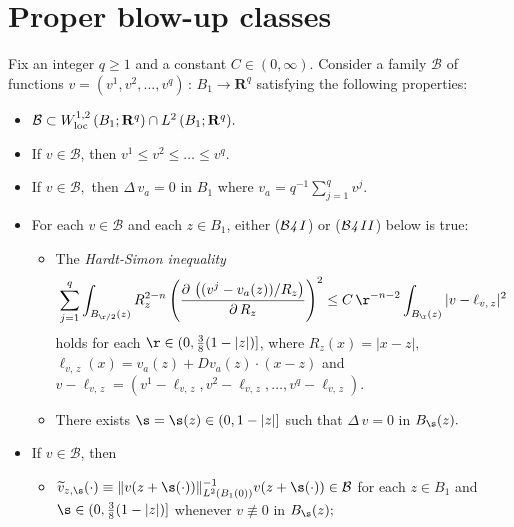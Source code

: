 \documentclass[a4paper,11pt]{amsart}
\begin{document}
\section{Proper blow-up classes}\label{proper-blow-up}
\setcounter{equation}{0}

Fix an integer $q \geq 1$  and a constant $C \in (0, \infty).$ Consider a
family ${\mathcal B}$ of functions $v = (v^{1}, v^{2}, \ldots, v^{q}) \, : \, B_{1} \to {\mathbf R}^{q}$ satisfying the following properties:

\begin{itemize}
\item[(${\mathcal B{\emph 1}}$)] ${\mathcal B} \subset W^{1, 2}_{\rm loc} \, (B_{1}; {\mathbf R}^{q}) \cap L^{2} \, (B_{1}; {\mathbf R}^{q}).$
\item[(${\mathcal B{\emph 2}}$)] If $v \in {\mathcal B}$, then $v^{1} \leq v^{2} \leq \ldots \leq v^{q}$.
\item[(${\mathcal B{\emph 3}}$)] If $v \in {\mathcal B},$ then $\Delta \, v_{a} = 0$ in $B_{1}$ where $v_{a} = q^{-1}\sum_{j=1}^{q} v^{j}.$
\item[(${\mathcal B{\emph 4}}$)] For each $v \in {\mathcal B}$ and each $z \in B_{1}$, either (${\mathcal B}{\emph 4 \, I}$) or (${\mathcal B}{\emph 4 \, II}$) below is true: 
\begin{itemize}
\item[(${\mathcal B{\emph 4 \,I}}$)] The {\em Hardt-Simon inequality} $$\sum_{j=1}^{q} \int_{B_{\r/2}(z)} R_{z}^{2-n} \left(\frac{\partial \, \left((v^{j} - v_{a}(z))/R_{z}\right)}{\partial \, R_{z}}\right)^{2} \leq C \, \r^{-n-2}\int_{B_{\r}(z)} |v - \ell_{v,\, z}|^{2}$$ 
holds for each $\r \in (0, \frac{3}{8}(1- |z|)]$, where $R_{z}(x) = |x - z|,$ $\ell_{v, \, z}(x) = v_{a}(z) + Dv_{a}(z) \cdot (x -z)$ 
and $v - \ell_{v, \, z} = (v^{1} - \ell_{v,\,z}, v^{2} - \ell_{v, \, z}, \ldots, v^{q} - \ell_{v, \, z}).$
\item[(${\mathcal B{\emph 4 \, II}}$)] There exists $\s  = \s(z) \in (0, 1 - |z|]$ such that $\Delta \, v = 0$ in $B_{\s}(z).$
\end{itemize}
\item[(${\mathcal B{\emph 5}}$)] If $v \in {\mathcal B}$, then
\begin{itemize}
\item[(${\mathcal B{\emph 5 \, I}}$)]${\widetilde v}_{z, \s}(\cdot) \equiv \|v(z + \s(\cdot))\|_{L^{2}(B_{1}(0))}^{-1}v(z + \s(\cdot)) \in {\mathcal B}$ for each $z \in B_{1}$ and $\s \in (0, \frac{3}{8}(1 - |z|)]$ whenever $v \not\equiv 0$ in $B_{\s}(z);$

\end{itemize}
\end{itemize}
\end{document}
